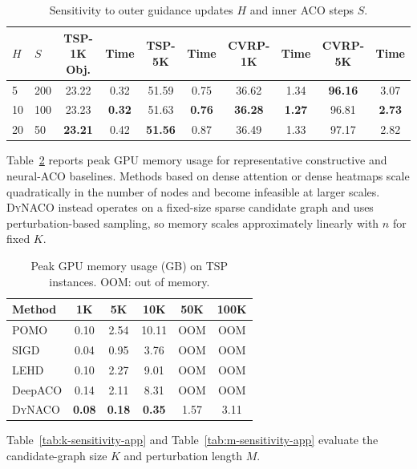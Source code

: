 \documentclass[journal]{IEEEtai}
\newcommand{\DyNACO}{\textsc{DyNACO}}
\begin{document}
\begin{table}[t]
\centering
\caption{Sensitivity to outer guidance updates $H$ and inner ACO steps $S$.}
\label{tab:hs-sensitivity-app}
\small
\renewcommand{\arraystretch}{0.85}
\begin{tabular*}{\textwidth}{@{\extracolsep{\fill}}llcccccccc@{}}
\toprule
$H$ & $S$ & TSP-1K Obj. & Time & TSP-5K & Time & CVRP-1K & Time & CVRP-5K & Time \\
\midrule
5 & 200 & 23.22 & 0.32 & 51.59 & 0.75 & 36.62 & 1.34 & \textbf{96.16} & 3.07 \\
10 & 100 & 23.23 & \textbf{0.32} & 51.63 & \textbf{0.76} & \textbf{36.28} & \textbf{1.27} & 96.81 & \textbf{2.73} \\
20 & 50 & \textbf{23.21} & 0.42 & \textbf{51.56} & 0.87 & 36.49 & 1.33 & 97.17 & 2.82 \\
\bottomrule
\end{tabular*}
\end{table}

Table~\ref{tab:memory-scaling} reports peak GPU memory usage for representative constructive and neural-ACO baselines. Methods based on dense attention or dense heatmaps scale quadratically in the number of nodes and become infeasible at larger scales. \DyNACO{} instead operates on a fixed-size sparse candidate graph and uses perturbation-based sampling, so memory scales approximately linearly with $n$ for fixed $K$.

\begin{table}[t]
\centering
\caption{Peak GPU memory usage (GB) on TSP instances. OOM: out of memory.}
\label{tab:memory-scaling}
\small
\renewcommand{\arraystretch}{0.85}
\begin{tabular*}{\columnwidth}{@{\extracolsep{\fill}}lccccc@{}}
\toprule
Method & 1K & 5K & 10K & 50K & 100K \\
\midrule
POMO & 0.10 & 2.54 & 10.11 & OOM & OOM \\
SIGD & 0.04 & 0.95 & 3.76 & OOM & OOM \\
LEHD & 0.10 & 2.27 & 9.01 & OOM & OOM \\
DeepACO & 0.14 & 2.11 & 8.31 & OOM & OOM \\
\DyNACO{} & \textbf{0.08} & \textbf{0.18} & \textbf{0.35} & 1.57 & 3.11 \\
\bottomrule
\end{tabular*}
\end{table}

Table~\ref{tab:k-sensitivity-app} and Table~\ref{tab:m-sensitivity-app} evaluate the candidate-graph size $K$ and perturbation length $M$.
\end{document}

